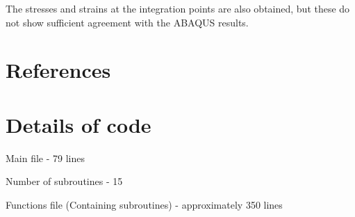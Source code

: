 \documentclass[review]{elsarticle}
\begin{document}
The stresses and strains at the integration points are also obtained, but these do not show sufficient agreement with the ABAQUS results.

\section*{References}


\section*{Details of code}

Main file - 79 lines

Number of subroutines - 15

Functions file (Containing subroutines) - approximately 350 lines
\end{document}
